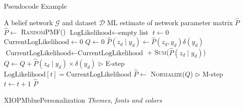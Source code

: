 \documentclass{beamer}
\begin{document}
\renewcommand{\algorithmicrequire}{\textbf{Input:}}
\renewcommand{\algorithmicensure}{\textbf{Output:}}
\newcommand*\CALL[2]{\textsc{#1}(#2)}
\newcommand*\ANNOTATE[1]{\hfill\(\triangleright\) #1}%

\footlinecolor{}

\begin{frame}[fragile]{Pseudocode Example}
\begin{algorithm}[H]
\fontsize{8}{1}\selectfont
\caption{Running EM using the joint PMFs, $P$, $Q$, $\hat P$}
\begin{algorithmic}
\REQUIRE A belief network $\mathcal{G}$ and dataset $ \mathcal{D}$
\ENSURE ML estimate of network parameter matrix $\hat P$
\STATE $\hat P \gets$ \CALL{RandomPMF}{}
\STATE $\text{LogLikelihood} \gets \text{empty list}$
\STATE $t \gets 0$
\REPEAT
    \STATE $\text{CurrentLogLikelihood} \gets 0$
    \STATE $Q \gets 0$
        \STATE $\hat P(z_d \mid y_d) \gets \hat P(z_d, y_d) \delta(y_d)$
        \STATE $\text{CurrentLogLikelihood} \gets \text{CurrentLogLikelihood}$ + \CALL{Sum}{$\hat P(z_d \mid y_d)$}
        \STATE $Q \gets Q + \hat P(z_d \mid y_d) \times \delta(y_d)$ \ANNOTATE{E-step}
    \ENDFOR
    \STATE $\text{LogLikelihood}[t] = \text{CurrentLogLikelihood}$
    \STATE $\hat P \gets$ \CALL{Normalize}{$Q$} \ANNOTATE{M-step}
    \STATE $t \gets t + 1$
\RETURN $\hat P$
\end{algorithmic}
\end{algorithm}
\end{frame}



\begin{chapter}{XIOPMblue}{Personalization}
\textit{Themes, fonts and colors}
\end{chapter}
\end{document}
